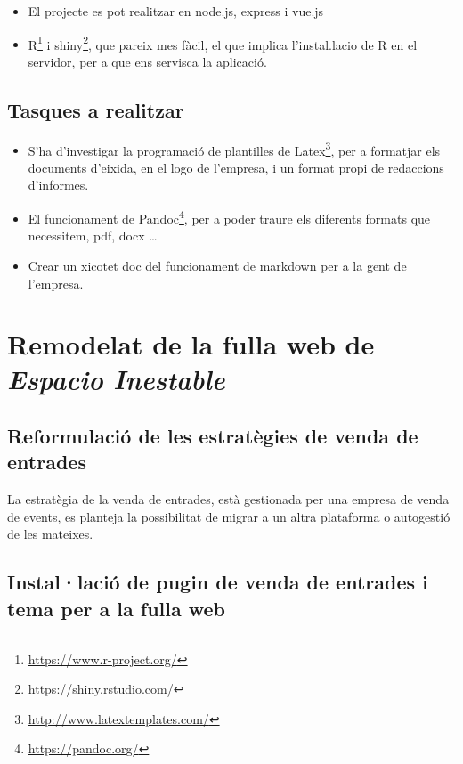 \documentclass[
  10pt,
]{krantz}
\DeclareRobustCommand{\href}[2]{#2\footnote{\url{#1}}}
\providecommand{\tightlist}{%
  \setlength{\itemsep}{0pt}\setlength{\parskip}{0pt}}
\begin{document}
\begin{itemize}
\tightlist
\item
  El projecte es pot realitzar en node.js, express i vue.js
\item
  \href{https://www.r-project.org/}{R} i \href{https://shiny.rstudio.com/}{shiny}, que pareix mes fàcil, el que implica l'instal.lacio de R en el servidor, per a que ens servisca la aplicació.
\end{itemize}

\hypertarget{tasques-a-realitzar}{%
\section{Tasques a realitzar}\label{tasques-a-realitzar}}

\begin{itemize}
\tightlist
\item
  S'ha d'investigar la programació de plantilles de \href{http://www.latextemplates.com/}{Latex}, per a formatjar els documents d'eixida, en el logo de l'empresa, i un format propi de redaccions d'informes.
\item
  El funcionament de \href{https://pandoc.org/}{Pandoc}, per a poder traure els diferents formats que necessitem, pdf, docx \ldots{}
\item
  Crear un xicotet doc del funcionament de markdown per a la gent de l'empresa.
\end{itemize}

\hypertarget{remodelat-de-la-fulla-web-de-espacio-inestable}{%
\chapter{\texorpdfstring{Remodelat de la fulla web de \emph{Espacio Inestable}}{Remodelat de la fulla web de Espacio Inestable}}\label{remodelat-de-la-fulla-web-de-espacio-inestable}}

\hypertarget{reformulaciuxf3-de-les-estratuxe8gies-de-venda-de-entrades}{%
\section{Reformulació de les estratègies de venda de entrades}\label{reformulaciuxf3-de-les-estratuxe8gies-de-venda-de-entrades}}

La estratègia de la venda de entrades, està gestionada per una empresa de venda de events, es planteja la possibilitat de migrar a un altra plataforma o autogestió de les mateixes.

\hypertarget{installaciuxf3-de-pugin-de-venda-de-entrades-i-tema-per-a-la-fulla-web}{%
\section{Instal·lació de pugin de venda de entrades i tema per a la fulla web}\label{installaciuxf3-de-pugin-de-venda-de-entrades-i-tema-per-a-la-fulla-web}}
\end{document}
